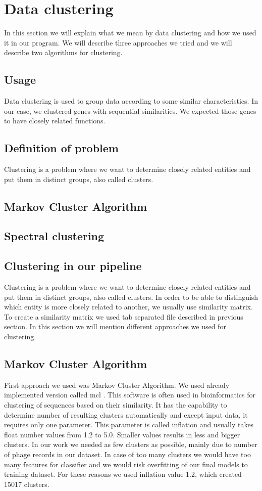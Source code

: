 \section{Data clustering}
In this section we will explain what we mean by data clustering and how we used it in our program.
We will describe three approaches we tried and we will describe two algorithms for clustering.

\subsection{Usage}
Data clustering is used to group data according to some similar characteristics.
In our case, we clustered genes with sequential similarities.
We expected those genes to have closely related functions.

\subsection{Definition of problem}
Clustering is a problem where we want to determine closely related entities and put them in distinct groups, also called clusters.

\subsection{Markov Cluster Algorithm}
\subsection{Spectral clustering}
\subsection{Clustering in our pipeline}
Clustering is a problem where we want to determine closely related entities and put them in distinct groups, also called clusters.
In order to be able to distinguish which entity is more closely related to another, we usually use similarity matrix.
To create a similarity matrix we used tab separated file described in previous section.
In this section we will mention different approaches we used for clustering. 
\subsection{Markov Cluster Algorithm}
First approach we used was Markov Cluster Algorithm. 
We used already implemented version called mcl \cite{mcl}.
This software is often used in bioinformatics for clustering of sequences based on their similarity.
It has the capability to determine number of resulting clusters automatically and except input data, it requires only one parameter.
This parameter is called inflation and usually takes float number values from 1.2 to 5.0.
Smaller values results in less and bigger clusters.
In our work we needed as few clusters as possible, mainly due to number of phage records in our dataset.
In case of too many clusters we would have too many features for classifier and we would risk overfitting of our final models to training dataset.
For these reasons we used inflation value 1.2, which created 15017 clusters.

